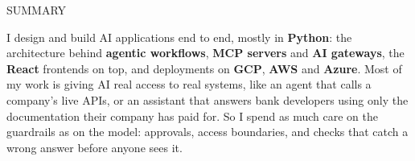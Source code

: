 \documentclass{resume} %
\begin{document}

\begin{rSection}{SUMMARY}

I design and build AI applications end to end, mostly in \textbf{Python}: the architecture behind \textbf{agentic workflows}, \textbf{MCP servers} and \textbf{AI gateways}, the \textbf{React} frontends on top, and deployments on \textbf{GCP}, \textbf{AWS} and \textbf{Azure}. Most of my work is giving AI real access to real systems, like an agent that calls a company's live APIs, or an assistant that answers bank developers using only the documentation their company has paid for. So I spend as much care on the guardrails as on the model: approvals, access boundaries, and checks that catch a wrong answer before anyone sees it.

\end{rSection}

\end{document}
